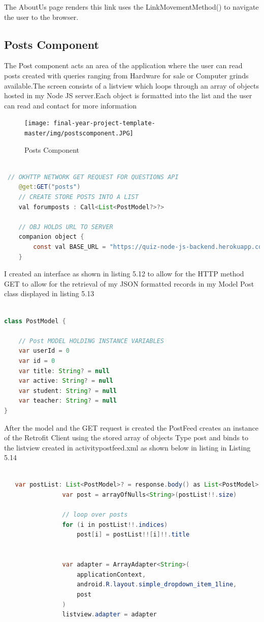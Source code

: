The AboutUs page renders this link uses the LinkMovementMethod() to navigate the user to the browser.



\subsection{Posts Component}
The Post component acts an area of the application where the user can read posts created with queries ranging from Hardware for sale or Computer  grinds available.The screen consists of a listview which loops through an array of objects hosted in my Node JS server.Each object is formatted into the list and the user can read and contact for more information

 \begin{figure}[H]
  \centering
    \texttt{[image: final-year-project-template-master/img/postscomponent.JPG]}
     \caption{Posts Component}
\end{figure}


\begin{lstlisting}[language=Java, caption=Posts Interface HTTP GET ]

 // OKHTTP NETWORK GET REQUEST FOR QUESTIONS API
    @get:GET("posts")
    // CREATE STORE POSTS INTO A LIST
    val forumposts : Call<List<PostModel?>?>

    // OBJ HOLDS URL TO SERVER
    companion object {
        const val BASE_URL = "https://quiz-node-js-backend.herokuapp.com/"
    }
\end{lstlisting}
I created an interface as shown in listing 5.12 to allow for the  HTTP method GET to allow for the retrieval of my JSON formatted records in my Model Post class displayed in listing 5.13

\begin{lstlisting}[language=Java, caption= PostModel Model class ]

class PostModel {

    // Post MODEL HOLDING INSTANCE VARIABLES
    var userId = 0
    var id = 0
    var title: String? = null
    var active: String? = null
    var student: String? = null
    var teacher: String? = null
}
\end{lstlisting}


After the model and the GET request is created the PostFeed creates an instance of the Retrofit Client using the stored array of objects Type post and binds to the listview created in activitypostfeed.xml as shown below in listing in Listing 5.14
\begin{lstlisting}[language=Java, caption= Render Arraylist  to view ]

   var postList: List<PostModel>? = response.body() as List<PostModel>
                var post = arrayOfNulls<String>(postList!!.size)

                // loop over posts
                for (i in postList!!.indices)
                    post[i] = postList!![i]!!.title


                var adapter = ArrayAdapter<String>(
                    applicationContext,
                    android.R.layout.simple_dropdown_item_1line,
                    post
                )
                listview.adapter = adapter
\end{lstlisting}
